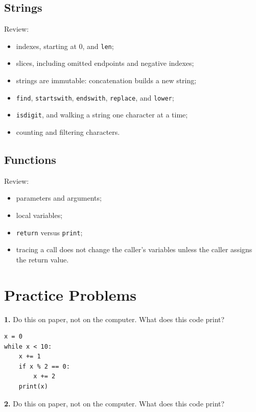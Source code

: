 \documentclass[11pt]{article}
\begin{document}
\subsection*{Strings}

Review:

\begin{itemize}
    \item indexes, starting at 0, and \texttt{len};
    \item slices, including omitted endpoints and negative indexes;
    \item strings are immutable: concatenation builds a new string;
    \item \texttt{find}, \texttt{startswith}, \texttt{endswith}, \texttt{replace}, and \texttt{lower};
    \item \texttt{isdigit}, and walking a string one character at a time;
    \item counting and filtering characters.
\end{itemize}

\subsection*{Functions}

Review:

\begin{itemize}
    \item parameters and arguments;
    \item local variables;
    \item \texttt{return} versus \texttt{print};
    \item tracing a call does not change the caller's variables unless the caller assigns the return value.
\end{itemize}

\newpage

\section*{Practice Problems}

\textbf{1.} Do this on paper, not on the computer. What does this code print?

\begin{lstlisting}
x = 0
while x < 10:
    x += 1
    if x % 2 == 0:
        x += 2
    print(x)
\end{lstlisting}

\textbf{2.} Do this on paper, not on the computer. What does this code print?
\end{document}
